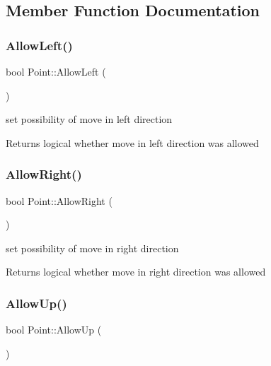 \subsection{Member Function Documentation}
\mbox{\label{class_point_a29eb3406055020f0e40bdf130ea74ee0}} 
\subsubsection{\texorpdfstring{Allow\+Left()}{AllowLeft()}}
{\footnotesize\ttfamily bool Point\+::\+Allow\+Left (\begin{DoxyParamCaption}{ }\end{DoxyParamCaption})}



set possibility of move in left direction 

\begin{DoxyReturn}{Returns}
logical whether move in left direction was allowed 
\end{DoxyReturn}
\mbox{\label{class_point_a92545dd0cf053357f70f809bf32a759f}} 
\subsubsection{\texorpdfstring{Allow\+Right()}{AllowRight()}}
{\footnotesize\ttfamily bool Point\+::\+Allow\+Right (\begin{DoxyParamCaption}{ }\end{DoxyParamCaption})}



set possibility of move in right direction 

\begin{DoxyReturn}{Returns}
logical whether move in right direction was allowed 
\end{DoxyReturn}
\mbox{\label{class_point_ae8e3d753aeaa848e2cc27d1a95f31646}} 
\subsubsection{\texorpdfstring{Allow\+Up()}{AllowUp()}}
{\footnotesize\ttfamily bool Point\+::\+Allow\+Up (\begin{DoxyParamCaption}{ }\end{DoxyParamCaption})}



